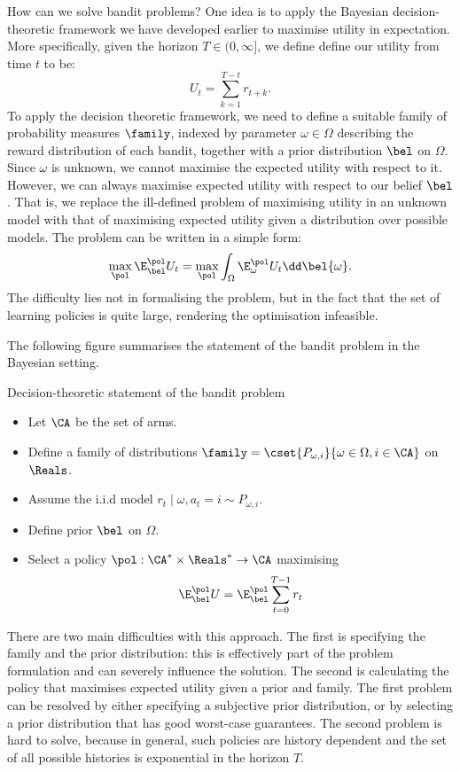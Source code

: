 How can we solve bandit problems? One idea is to apply the Bayesian
decision-theoretic framework we have developed earlier to maximise
utility in expectation.  More specifically, given the horizon $T
\in (0, \infty]$, we define
define our utility from time $t$ to be:
\begin{equation}
  \label{eq:reward-utility}
  U_t = \sum_{k=1}^{T-t} r_{t+k}.
\end{equation}
To apply the decision theoretic framework, we need to define a suitable family of probability measures $\family$, indexed by parameter $\omega \in \Omega$ describing the reward distribution of each bandit, together with a prior distribution $\bel$ on $\Omega$. Since $\omega$ is unknown, we cannot maximise the expected utility with respect to it. However, we can always maximise expected utility with respect to our belief $\bel$. That is, we replace the ill-defined problem of maximising utility in an unknown model with that of maximising expected utility given a distribution over possible models. The problem can be written in a simple form:
\begin{equation}
  \label{eq:bel-reward-utility}
  \max_\pol \E_\bel^\pol U_t = 
  \max_\pol \int_\Omega \E_\omega^\pol U_t \dd \bel{\omega}.
\end{equation}
The difficulty lies not in formalising the problem, but in the fact that the set of learning policies is quite large, rendering the optimisation infeasible. 

The following figure summarises the statement of the bandit problem in the Bayesian setting.
\begin{block}{Decision-theoretic statement of the bandit problem}
  \begin{itemize}
  \item Let $\CA$ be the set of arms.
  \item Define a family of distributions $\family = \cset{P_{\omega, i}}{\omega \in \Omega, i \in \CA}$ on $\Reals$.
  \item Assume the i.i.d model $r_t \mid \omega, a_t = i \sim P_{\omega, i}$.
  \item Define prior $\bel$ on $\Omega$.
  \item Select a policy $\pol : \CA^* \times \Reals^* \to \CA$ maximising
    \[
    \E^\pol_\bel U = \E^\pol_\bel \sum_{t=0}^{T - 1}  r_{t}
    \]
  \end{itemize}
\end{block}
There are two main difficulties with this approach. The first is specifying the family and the prior distribution: this is effectively part of the problem formulation and can severely influence the solution. The second is calculating the policy that maximises expected utility given a prior and family. The first problem can be resolved by either specifying a subjective prior distribution, or by selecting a prior distribution that has good worst-case guarantees. The second problem is hard to solve, because in general, such policies are history dependent and the set of all possible histories is exponential in the horizon $T$.

